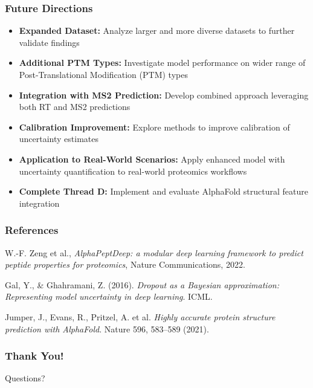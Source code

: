 \documentclass{beamer}
\begin{document}
\begin{frame}
  \frametitle{Future Directions}
  \begin{itemize}
    \item \textbf{Expanded Dataset:} Analyze larger and more diverse datasets to further validate findings
    \item \textbf{Additional PTM Types:} Investigate model performance on wider range of Post-Translational Modification (PTM) types
    \item \textbf{Integration with MS2 Prediction:} Develop combined approach leveraging both RT and MS2 predictions
    \item \textbf{Calibration Improvement:} Explore methods to improve calibration of uncertainty estimates
    \item \textbf{Application to Real-World Scenarios:} Apply enhanced model with uncertainty quantification to real-world proteomics workflows
    \item \textbf{Complete Thread D:} Implement and evaluate AlphaFold structural feature integration
  \end{itemize}
\end{frame}

\begin{frame}
  \frametitle{References}
  \footnotesize{
  \begin{thebibliography}{1}
    W.-F. Zeng et al., \emph{AlphaPeptDeep: a modular deep learning framework to predict peptide properties for proteomics}, Nature Communications, 2022.
    
    Gal, Y., \& Ghahramani, Z. (2016). \emph{Dropout as a Bayesian approximation: Representing model uncertainty in deep learning}. ICML.
    
    Jumper, J., Evans, R., Pritzel, A. et al. \emph{Highly accurate protein structure prediction with AlphaFold}. Nature 596, 583–589 (2021).
  \end{thebibliography}
  }
\end{frame}

\begin{frame}
  \frametitle{Thank You!}
  \begin{center}
    \Huge Questions?
  \end{center}
\end{frame}
\end{document}
